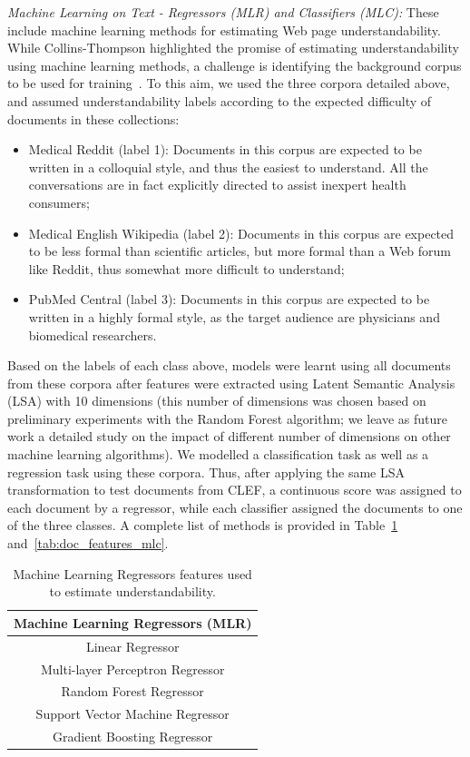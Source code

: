 \documentclass[10pt,a4paper]{article}
\begin{document}
\textit{Machine Learning on Text - Regressors (MLR) and Classifiers (MLC):} These include machine learning methods for estimating Web page understandability. While Collins-Thompson highlighted the promise of estimating understandability using machine learning methods, a challenge is identifying the background corpus to be used for training~\cite{collins2014computational}. To this aim, we used the three corpora detailed above, and assumed understandability labels according to the expected difficulty of documents in these collections:

\begin{itemize}[leftmargin=*]
    \item Medical Reddit (label 1): Documents in this corpus are expected to be written in a colloquial style, and thus the easiest to understand. All the conversations are in fact explicitly directed to assist inexpert health consumers;
	\item Medical English Wikipedia (label 2): Documents in this corpus are expected to be less formal than scientific articles, but more formal than a Web forum like Reddit, thus somewhat more difficult to understand;
	\item PubMed Central (label 3): Documents in this corpus are expected to be written in a highly formal style, as the target audience are physicians and biomedical researchers.
\end{itemize}

Based on the labels of each class above, models were learnt using all documents from these corpora after features were extracted using Latent Semantic Analysis (LSA) with 10 dimensions (this number of dimensions was chosen based on preliminary experiments with the Random Forest algorithm; we leave as future work a detailed study on the impact of different number of dimensions on other machine learning algorithms). We modelled a classification task as well as a regression task using these corpora. Thus, after applying the same LSA transformation to test documents from CLEF, a continuous score was assigned to each document by a regressor, while each classifier assigned the documents to one of the three classes.  A complete list of methods is provided in Table~\ref{tab:doc_features_mlr} and~\ref{tab:doc_features_mlc}.

\begin{table}
\caption{Machine Learning Regressors features used to estimate understandability.}
\label{tab:doc_features_mlr} \vspace{-10pt}
\begin{tabular}{c}
\toprule 
\textbf{Machine Learning Regressors (MLR)}\tabularnewline
\midrule 
Linear Regressor\tabularnewline
Multi-layer Perceptron Regressor\tabularnewline
Random Forest Regressor\tabularnewline
Support Vector Machine Regressor\tabularnewline
Gradient Boosting Regressor\tabularnewline
\bottomrule
\end{tabular}
\end{table}
\end{document}
